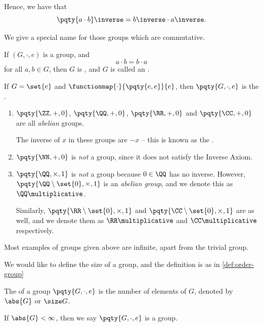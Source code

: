 Hence, we have that
\[
    \pqty{a \cdot b}\inverse = b \inverse \cdot a \inverse.
\]

We give a special name for those groups which are commutative.

\begin{definition}
    \label{def:abelian-group}%
    If \((G, \cdot, e)\) is a group, and
    \[
        a \cdot b = b \cdot a
    \]
    for all \(a, b \in G\), then \(G\) is , and \(G\) is called an .
\end{definition}

\begin{example*}
    If \(G = \set{e}\) and \(\functionmap{\cdot}{\pqty{e, e}}{e}\), then \(\pqty{G, \cdot, e}\) is the .
\end{example*}

\begin{examples*}
    \begin{enumerate}
        \item \(\pqty{\ZZ, +, 0}\), \(\pqty{\QQ, +, 0}\), \(\pqty{\RR, +, 0}\) and \(\pqty{\CC, +, 0}\) are all \emph{abelian} groups.
        
        The inverse of \(x\) in these groups are \(-x\) -- this is known as the .

        \item \(\pqty{\NN, +, 0}\) is \emph{not} a group, since it does not satisfy the Inverse Axiom.
        
        \item \(\pqty{\QQ, \times, 1}\) is \emph{not} a group because \(0 \in \QQ\) has no inverse. However, \(\pqty{\QQ \setminus \set{0}, \times, 1}\) is an \emph{abelian group}, and we denote this as \(\QQ\multiplicative\).
        
        Similarly, \(\pqty{\RR \setminus \set{0}, \times, 1}\) and \(\pqty{\CC \setminus \set{0}, \times, 1}\) are as well, and we denote them as \(\RR\multiplicative\) and \(\CC\multiplicative\) respectively.
    \end{enumerate}
\end{examples*}

Most examples of groups given above are infinite, apart from the trivial group.

We would like to define the size of a group, and the definition is as in  \autoref{def:order-group}

\begin{definition}
    \label{def:order-group}%
    The  of a group \(\pqty{G, \cdot, e}\) is the number of elements of \(G\), denoted by \(\abs{G}\) or \(\size G\).

    If \(\abs{G} < \infty\), then we say \(\pqty{G, \cdot, e}\) is a  group.
\end{definition}

